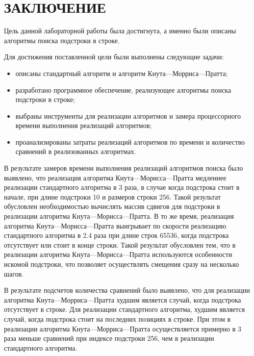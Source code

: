 \chapter*{ЗАКЛЮЧЕНИЕ}

Цель данной лабораторной работы была достигнута, а именно были описаны алгоритмы поиска подстроки в строке.

Для достижения поставленной цели были выполнены следующие задачи:
\begin{itemize}
	\item описаны стандартный алгоритм и алгоритм Кнута---Морриса---Пратта;
	\item разработано программное обеспечение, реализующее алгоритмы поиска подстроки в строке;
	\item выбраны инструменты для реализации алгоритмов и замера процессорного времени выполнения реализаций алгоритмов;
	\item проанализированы затраты реализаций алгоритмов по времени и количество сравнений в реализованных алгоритмах.
\end{itemize}

В результате замеров времени выполнения реализаций алгоритмов поиска было выявлено, что реализация алгоритма Кнута---Морисса---Пратта медленнее реализации стандартного алгоритма в 3 раза, в случае когда подстрока стоит в начале, при длине подстроки 10 и размеров строки 256. 
Такой результат обусловлен необходимостью вычислять массив сдвигов для подстроки в реализации алгоритма Кнута---Морисса---Пратта.
В то же время, реализация алгоритма Кнута---Морисса---Пратта выигрывает по скорости реализацию стандартного алгоритма в 2.4 раза при длине строк 65536, когда подстрока отсутствует или стоит в конце строки. 
Такой результат обусловлен тем, что в реализации алгоритма Кнута---Морисса---Пратта используются особенности искомой подстроки, что позволяет осуществлять смещения сразу на несколько шагов.

В результате подсчетов количества сравнений было выявлено, что для реализации алгоритма Кнута---Морриса---Пратта худшим является случай, когда подстрока отсутствует в строке. Для реализации стандартного алгоритма, худшим является случай, когда подстрока стоит на последних позициях в строке. При этом в реализации алгоритма Кнута---Морриса---Пратта осуществляется примерно в 3 раза меньше сравнений при индексе подстроки 256, чем в реализации стандартного алгоритма.


